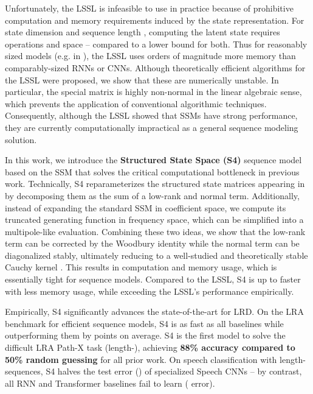 \documentclass{article}
\newcommand{\methodabbrv}{S4}
\begin{document}
Unfortunately, the LSSL is infeasible to use in practice because of prohibitive computation and memory requirements induced by the state representation.
For state dimension  and sequence length , computing the latent state requires  operations and  space -- compared to a  lower bound for both.
Thus for reasonably sized models (e.g.  in \citet{gu2021lssl}), the LSSL uses orders of magnitude more memory than comparably-sized RNNs or CNNs.
Although theoretically efficient algorithms for the LSSL were proposed, we show that these are numerically unstable.
In particular, the special  matrix is highly non-normal in the linear algebraic sense, which prevents the application of conventional algorithmic techniques. Consequently, although the LSSL showed that SSMs have strong performance, they are currently computationally impractical as a general sequence modeling solution.

In this work, we introduce the \textbf{Structured State Space (\methodabbrv)} sequence model based on the SSM that solves the critical computational bottleneck in previous work.
Technically, \methodabbrv{} reparameterizes the structured state matrices  appearing in \citet{voelker2019legendre,gu2020hippo} by decomposing them as the sum of a low-rank and normal term.
Additionally, instead of expanding the standard SSM in coefficient space, we compute its truncated generating function in frequency space, which can be simplified into a multipole-like evaluation.
Combining these two ideas, we show that the low-rank term can be corrected by the Woodbury identity while the normal term can be diagonalized stably,
ultimately reducing to a well-studied and theoretically stable Cauchy kernel \citep{pan2001structured,pan2017fast}.
This results in  computation and  memory usage, which is essentially tight for sequence models.
Compared to the LSSL, \methodabbrv{} is up to  faster with  less memory usage, while exceeding the LSSL's performance empirically.






Empirically, \methodabbrv{} significantly advances the state-of-the-art for LRD.
On the LRA benchmark for efficient sequence models, \methodabbrv{} is as fast as all baselines while outperforming them by  points on average.
\methodabbrv{} is the first model to solve the difficult LRA Path-X task (length-), achieving \textbf{88\% accuracy compared to 50\% random guessing} for all prior work.
On speech classification with length- sequences, \methodabbrv{} halves the test error () of specialized Speech CNNs --
by contrast, all RNN and Transformer baselines fail to learn ( error).
\end{document}

